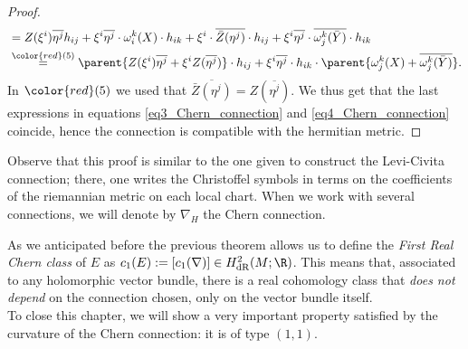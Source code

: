 \begin{proof}
\begin{align}
\begin{split}
        & = Z(\xi^i) \overline{\eta^j}h_{ij}+ \xi ^i \overline{\eta^j}\cdot {\omega_i^k(X)}\cdot h_{ik} + \xi^i \cdot  \overline{\bar{Z}(\eta^j)}\cdot h_{ij} + \xi^i  \overline{\eta^j} \cdot \overline{ \omega^k_j(\bar{Y})}\cdot h_{ik} \\
        & \overset{{\color{red}(5)}}{=} \parent{Z(\xi^i) \overline{\eta^j} + \xi^i Z(\overline{\eta^j})}\cdot h_{ij} + \xi^i \overline{\eta^j } \cdot h_{ik} \cdot \parent{\omega^k_j(X) + \overline{\omega^k_j(\bar{Y})}}.
        \end{split}
    \end{align}
    In \({\color{red}(5)}\) we used that \(\overline{\bar{Z}(\eta^j)}=Z(\overline{\eta^j})\). We thus get that the last expressions in equations \eqref{eq3_Chern_connection} and \eqref{eq4_Chern_connection} coincide, hence the connection is compatible with the hermitian metric.
\end{proof}
Observe that this proof is similar to the one given to construct the Levi-Civita connection; there, one writes the Christoffel symbols in terms on the coefficients of the riemannian metric on each local chart. When we work with several connections, we will denote by \(\nabla_H\) the Chern connection. 

As we anticipated before the previous theorem allows us to define the \textit{First Real Chern class} of \(E\) as \(c_1(E):=[c_1(\nabla)]\in H^2_{\mathrm{dR}}(M;\R)\). This means that, associated to any holomorphic vector bundle, there is a real cohomology class that \textit{does not depend} on the connection chosen, only on the vector bundle itself. \\

To close this chapter, we will show a very important property satisfied by the curvature of the Chern connection: it is of type \((1,1)\).

